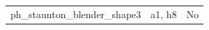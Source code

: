 \begin{longtable}{>{\raggedright\arraybackslash}p{.47\linewidth}>{\raggedright\arraybackslash}p{.25\linewidth}l}
ph\_\allowbreak{}staunton\_\allowbreak{}blender\_\allowbreak{}shape3 & %
a1, h8 & %
No \\ %

\end{longtable}
\endgroup
